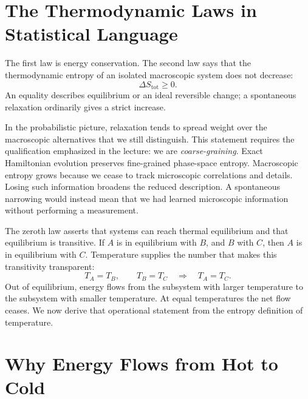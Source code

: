 \section{The Thermodynamic Laws in Statistical Language}

The first law is energy conservation. The second law says that the
thermodynamic entropy of an isolated macroscopic system does not decrease:
\begin{equation}
 \Delta S_{\mathrm{tot}}\geq0.
 \label{eq:sm3-second-law}
\end{equation}
An equality describes equilibrium or an ideal reversible change; a spontaneous
relaxation ordinarily gives a strict increase.

In the probabilistic picture, relaxation tends to spread weight over the
macroscopic alternatives that we still distinguish. This statement requires
the qualification emphasized in the lecture: we are \emph{coarse-graining}.
Exact Hamiltonian evolution preserves fine-grained phase-space entropy.
Macroscopic entropy grows because we cease to track microscopic correlations
and details. Losing such information broadens the reduced description. A
spontaneous narrowing would instead mean that we had learned microscopic
information without performing a measurement.

The zeroth law asserts that systems can reach thermal equilibrium and that
equilibrium is transitive. If \(A\) is in equilibrium with \(B\), and \(B\)
with \(C\), then \(A\) is in equilibrium with \(C\). Temperature supplies the
number that makes this transitivity transparent:
\[
 T_A=T_B,\qquad T_B=T_C
 \quad\Longrightarrow\quad
 T_A=T_C.
\]
Out of equilibrium, energy flows from the subsystem with larger temperature
to the subsystem with smaller temperature. At equal temperatures the net flow
ceases. We now derive that operational statement from the entropy definition
of temperature.

\section{Why Energy Flows from Hot to Cold}

